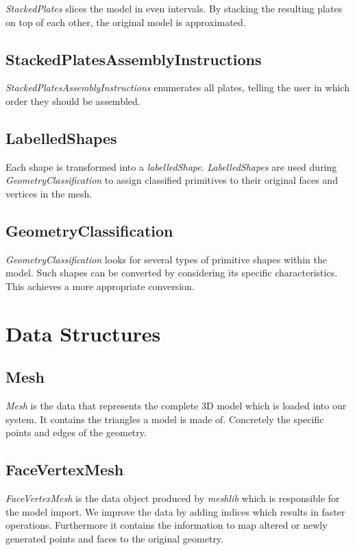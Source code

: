 \documentclass[../ClassicThesis.tex]{subfiles}
\begin{document}
\emph{StackedPlates} slices the model in even intervals. By stacking the resulting plates on top of each other, the original model is approximated.


\subsection*{StackedPlatesAssemblyInstructions}

\emph{StackedPlatesAssemblyInstructions} enumerates all plates, telling the user in which order they should be assembled.


\subsection*{LabelledShapes}

Each shape is transformed into a \emph{labelledShape}. \emph{LabelledShapes} are used during \emph{GeometryClassification} to assign classified primitives to their original faces and vertices in the mesh.


\subsection*{GeometryClassification}

\emph{GeometryClassification} looks for several types of primitive shapes within the model. Such shapes can be converted by considering its specific characteristics. This achieves a more appropriate conversion.


\section{Data Structures}

\subsection*{Mesh}

\emph{Mesh} is the data that represents the complete 3D model which is loaded into our system. It contains the triangles a model is made of. Concretely the specific points and edges of the geometry.

\subsection*{FaceVertexMesh}

\emph{FaceVertexMesh} is the data object produced by \emph{meshlib} which is responsible for the model import. We improve the data by adding indices which results in faster operations. Furthermore it contains the information to map altered or newly generated points and faces to the original geometry.
\end{document}
